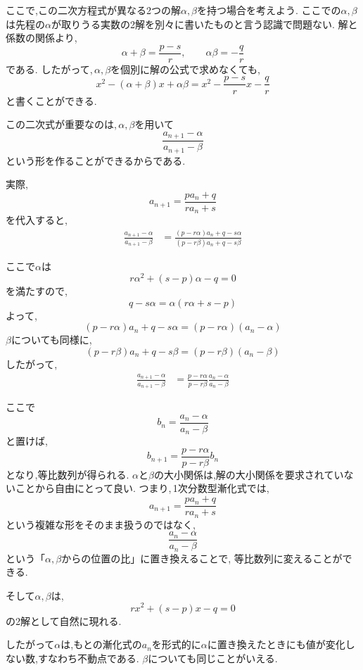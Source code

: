     ここで,この二次方程式が異なる2つの解$\alpha,\beta$を持つ場合を考えよう.
    ここでの$\alpha,\beta$は先程の$\alpha$が取りうる実数の2解を別々に書いたものと言う認識で問題ない.
    解と係数の関係より,
    \[
      \alpha+\beta=\frac{p-s}{r},
      \qquad
      \alpha\beta=-\frac qr
    \]
    である.
    したがって,\,$\alpha,\beta$を個別に解の公式で求めなくても,
    \[
      x^2-(\alpha+\beta)x+\alpha\beta
      =
      x^2-\frac{p-s}{r}x-\frac qr
    \]
    と書くことができる.

    この二次式が重要なのは,\,$\alpha,\beta$を用いて
    \[
      \frac{a_{n+1}-\alpha}{a_{n+1}-\beta}
    \]
    という形を作ることができるからである.

    実際,
    \[
      a_{n+1}=\frac{pa_n+q}{ra_n+s}
    \]
    を代入すると,
    \begin{align*}
      \frac{a_{n+1}-\alpha}{a_{n+1}-\beta}
      &=
      \frac{(p-r\alpha)a_n+q-s\alpha}{(p-r\beta)a_n+q-s\beta}
    \end{align*}
    
    ここで$\alpha$は
    \[
      r\alpha^2+(s-p)\alpha-q=0
    \]
    を満たすので,
    \[
      q-s\alpha
      =\alpha(r\alpha+s-p)
    \]
    よって,
    \[
      (p-r\alpha)a_n+q-s\alpha
      =(p-r\alpha)(a_n-\alpha)
    \]
    $\beta$についても同様に,
    \[
      (p-r\beta)a_n+q-s\beta
      =(p-r\beta)(a_n-\beta)
    \]
    したがって,
    \begin{align*}
      \frac{a_{n+1}-\alpha}{a_{n+1}-\beta}
      &=
      \frac{p-r\alpha}{p-r\beta}
      \frac{a_n-\alpha}{a_n-\beta}
    \end{align*}
    
    ここで
    \[
      b_n=\frac{a_n-\alpha}{a_n-\beta}
    \]
    と置けば,
    \[
      b_{n+1}
      =
      \frac{p-r\alpha}{p-r\beta}b_n
    \]
    となり,等比数列が得られる.
    $\alpha$と$\beta$の大小関係は,解の大小関係を要求されていないことから自由にとって良い.
    つまり,\,1次分数型漸化式では,
    \[
      a_{n+1}=\frac{pa_n+q}{ra_n+s}
    \]
    という複雑な形をそのまま扱うのではなく,
    \[
      \frac{a_n-\alpha}{a_n-\beta}
    \]
    という「$\alpha,\beta$からの位置の比」に置き換えることで,
    等比数列に変えることができる.

    そして$\alpha,\beta$は,
    \[
      rx^2+(s-p)x-q=0
    \]
    の2解として自然に現れる.
    
    したがって$\alpha$は,もとの漸化式の$a_n$を形式的に$\alpha$に置き換えたときにも値が変化しない数,すなわち不動点である.
    $\beta$についても同じことがいえる.
    
